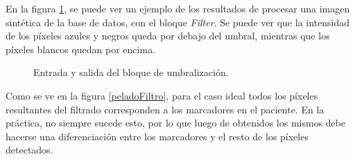 En la figura \ref{ejemploUmbralizacion}, se puede ver un ejemplo de los resultados de procesar una imagen sintética de la base de datos, con el bloque \emph{Filter}. Se puede ver que la intensidad de los píxeles azules y negros queda por debajo del umbral, mientras que los píxeles blancos quedan por encima. %

\begin{figure}[H]
        \centering
         \hspace{1cm}        
  \caption{Entrada y salida del bloque de umbralización.}
      \label{ejemploUmbralizacion}
\end{figure}

Como se ve en la figura \ref{peladoFiltro}, para el caso ideal todos los píxeles resultantes del filtrado corresponden a los marcadores en el paciente. En la práctica, no siempre sucede esto, por lo que luego de obtenidos los mismos debe hacerse una diferenciación entre los marcadores y el resto de los píxeles detectados.

